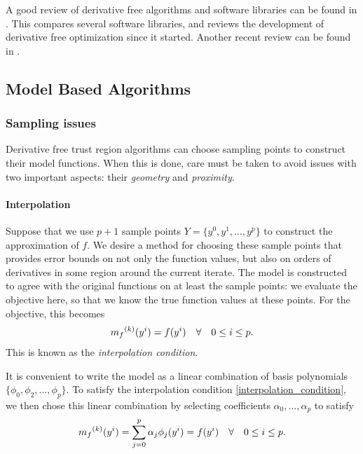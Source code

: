 A good review of derivative free algorithms and software libraries can be found in \cite{DUMMY:review}.
This compares several software libraries, and reviews the development of derivative free optimization since it started.
Another recent review can be found in \cite{DUMMY:review2}.



\subsection{Model Based Algorithms}

\subsubsection{Sampling issues}

Derivative free trust region algorithms can choose sampling points to construct their model functions.
When this is done, care must be taken to avoid issues with two important aspects: their \emph{geometry} and \emph{proximity}.

\paragraph{Interpolation}
\label{interpolation}
Suppose that we use $p+1$ sample points $Y = \{y^0, y^1, \ldots, y^p\}$ to construct the approximation of $f$.
We desire a method for choosing these sample points that provides error bounds on not only the function values, but also on orders of derivatives in some region around the current iterate.
The model is constructed to agree with the original functions on at least the sample points: we evaluate the objective here, so that we know the true function values at these points.
For the objective, this becomes
\begin{align}
\label{interpolation_condition}
{{m}_f}^{(k)}(y^i) = f(y^i) \quad \forall \quad 0 \le i \le p.
\end{align}
This is known as the \emph{interpolation condition}.

It is convenient to write the model as a linear combination of basis polynomials $\{\phi_0, \phi_2, \ldots, \phi_p\}$.
To satisfy the interpolation condition \cref{interpolation_condition}, we then chose this linear combination by selecting coefficients $\alpha_0, \ldots, \alpha_p$ to satisfy
\begin{align}
\label{interpolation_formula}
    {{m}_f}^{(k)}(y^i) = \sum^p_{j=0}\alpha_j\phi_j(y^i) = f(y^i) \quad \forall \quad 0 \le i \le p.
\end{align}

